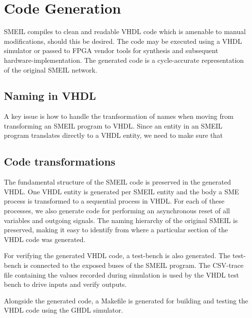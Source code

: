 \chapter{Code Generation}
\label{sec:codegen}
SMEIL compiles to clean and readable VHDL code which is amenable to manual
modifications, should this be desired. The code may be executed using a VHDL
simulator or passed to FPGA vendor tools for synthesis and subsequent
hardware-implementation. The generated code is a cycle-accurate representation
of the original SMEIL network.

\section{Naming in VHDL}
A key issue is how to handle the tranfsormation of names when moving from
transforming an SMEIL program to VHDL. Since an entity in an SMEIL program
translates directly to a VHDL entity, we need to make sure that 

\section{Code transformations}

The fundamental structure of the SMEIL code is preserved in the generated
VHDL. One VHDL entity is generated per SMEIL entity and the body a SME process
is transformed to a sequential process in VHDL. For each of these processes, we
also generate code for performing an asynchronous reset of all variables and
outgoing signals. The naming hierarchy of the original SMEIL is preserved,
making it easy to identify from where a particular section of the VHDL code was
generated.

For verifying the generated VHDL code, a test-bench is also generated. The
test-bench is connected to the {\ttfamily exposed} buses of the SMEIL program. The
CSV-trace file containing the values recorded during simulation is used by the
VHDL test bench to drive inputs and verify outputs.

Alongside the generated code, a {\ttfamily Makefile} is generated for building
and testing the VHDL code using the GHDL simulator.

